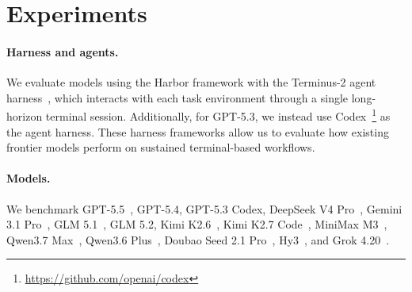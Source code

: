 \section{Experiments}
\label{sec:experiments}

\paragraph{Harness and agents.}
We evaluate models using the Harbor framework with the Terminus-2 agent harness~\cite{Harbor_Framework}, which interacts with each task environment through a single long-horizon terminal session. 
%
Additionally, for GPT-5.3, we instead use Codex~\cite{openai2025gpt5}\footnote{\url{https://github.com/openai/codex}} as the agent harness.
%
These harness frameworks allow us to evaluate how existing frontier models perform on sustained terminal-based workflows.

\paragraph{Models.}
We benchmark GPT-5.5~\cite{openai2025gpt5}, GPT-5.4, GPT-5.3 Codex, DeepSeek V4 Pro~\cite{deepseekai2026deepseekv4}, Gemini 3.1 Pro~\cite{google2026gemini31pro}, GLM 5.1~\cite{glm5team2026glm5vibecodingagentic}, GLM 5.2, Kimi K2.6~\cite{moonshot2026kimik26}, Kimi K2.7 Code~\cite{moonshot2026kimik27code}, MiniMax M3~\cite{minimax2026minimaxm3}, Qwen3.7 Max~\cite{qwen2026qwen37}, Qwen3.6 Plus~\cite{qwen2026qwen36}, Doubao Seed 2.1 Pro~\cite{bytedance2026seed21}, Hy3~\cite{tencent2026hunyuan3}, and Grok 4.20~\cite{xai2026grok420}.







